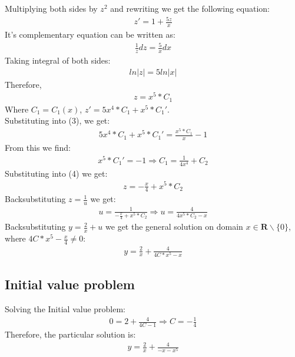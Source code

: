 \documentclass[12pt]{article}
\begin{document}
Multiplying both sides by $z^2$ and rewriting we get the following equation:
\begin{gather}
z' = 1 + \frac{5z}{x} 
\end{gather}
It's complementary equation can be written as:
\begin{gather*}
\frac{1}{z}dz = \frac{5}{x}dx
\end{gather*}
Taking integral of both sides:
\begin{gather*}
ln|z| = 5ln|x|
\end{gather*}
Therefore, 
\begin{gather}
    z = x^5 * C_1
\end{gather}
Where $C_1 = C_1(x)$, $ z'= 5x^4*C_1 + x^5*C_1'$. \\
Substituting into (3), we get:
\begin{gather*}
5x^4*C_1 + x^5*C_1' = \frac{x^5 * C_1 }{x} - 1
\end{gather*}
From this we find:
\begin{gather*}
x^5 * C_1' = -1 \Rightarrow C_1 = \frac{1}{4x^4} + C_2
\end{gather*}
Substituting into (4) we get:
\begin{gather*}
z = - \frac{x}{4} + x^5*C_2
\end{gather*}
Backsubstituting $ z= \frac{1}{u}$ we get:
\begin{gather*}
u = \frac{1}{ -\frac{x}{4} + x^5*C_2 } \Rightarrow u = \frac{4}{4x^5*C_2 - x}
\end{gather*}
Backsubstituting $ y = \frac{2}{x} + u$ we get the general solution on 
domain $x \in \mathbf{R} \backslash \{0\}$, \\
where $4C*x^5 - \frac{x}{4} \neq 0$:
\begin{gather*}
y = \frac{2}{x} +  \frac{4}{ 4C*x^5 - x }
\end{gather*}
\subsection*{Initial value problem}
Solving the Initial value problem:
\begin{gather*}
0 = 2 + \frac{4}{4C-1} \Rightarrow C = -\frac{1}{4}
\end{gather*}
Therefore, the particular solution is:
\begin{gather*}
y = \frac{2}x + \frac{4}{-x -x^5}
\end{gather*}
\newpage
\end{document}
